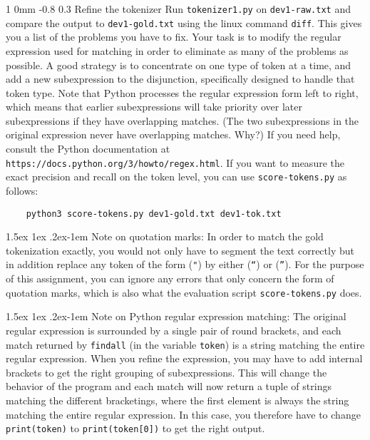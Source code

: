 \documentclass[11pt]{article}
\makeatletter
\newcommand{\newsec}[2]{\section{#1}\label{sec:#2}\noindent}
\renewcommand{\section}{\@startsection
{section}%
{1}%
{0mm}%
{-0.8\baselineskip}%
{0.3\baselineskip}%
{\bfseries\large}}%
\renewcommand{\paragraph}{%
  \@startsection{paragraph}{4}%
  {\z@}{1.5ex \@plus 1ex \@minus .2ex}{-1em}%
  {\normalfont\normalsize\bfseries}%
}\makeatother
\makeatother
\begin{document}
\newsec{Refine the tokenizer}{refine}%
Run {\tt tokenizer1.py} on {\tt dev1-raw.txt} and compare the output to {\tt dev1-gold.txt} using the linux command {\tt diff}. This gives you a list of the problems you have to fix.
Your task is to modify the regular expression used for matching in order to eliminate as many of the problems as possible. A good strategy is to concentrate on one type of token at a time,
and add a new subexpression to the disjunction, specifically designed to handle that token type. Note that Python processes the regular expression form left to right, which means
that earlier subexpressions will take priority over later subexpressions if they have overlapping matches. (The two subexpressions in the original expression never have
overlapping matches. Why?) If you need help, consult the Python documentation at {\tt https://docs.python.org/3/howto/regex.html}. If you want to measure the exact precision and recall on the token level, you can use {\tt score-tokens.py} as follows:
\begin{verbatim}
    python3 score-tokens.py dev1-gold.txt dev1-tok.txt
\end{verbatim}


\paragraph{Note on quotation marks:} In order to match the gold tokenization exactly, you would not only have to segment the text correctly but in addition replace
any token of the form ({\tt "}) by either ({\tt ``}) or ({\tt ''}). For the purpose of this assignment, you can ignore any errors that only concern the form of quotation marks,
which is also what the evaluation script {\tt score-tokens.py} does.

\paragraph{Note on Python regular expression matching:} The original regular expression is surrounded by a single pair of round brackets, and each match returned
by {\tt findall} (in the variable {\tt token}) is a string matching the entire regular expression. When you refine the expression, you may have to add internal brackets to get the right grouping of subexpressions. This will change the behavior of the program and each match will now return a tuple of strings matching the different bracketings, where the first 
element is always the string matching the entire regular expression. In this case, you therefore have to change {\tt print(token)} to {\tt print(token[0])} to get the right output.
 
\end{document}
